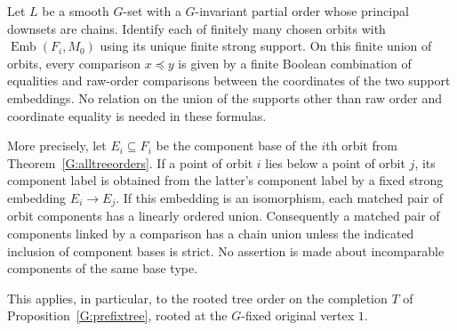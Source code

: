 \begin{proposition}
\label{G:order-only-tree-comparisons}
Let $L$ be a smooth $G$-set with a $G$-invariant partial order
whose principal downsets are chains. Identify each of finitely
many chosen orbits with $\operatorname{Emb}(F_i,M_0)$ using its
unique finite strong support. On this finite union of orbits,
every comparison $x\preceq y$ is given by a finite Boolean
combination of equalities and raw-order comparisons between
the coordinates of the two support embeddings. No relation on
the union of the supports other than raw order and coordinate
equality is needed in these formulas.

More precisely, let $E_i\subseteq F_i$ be the component base
of the $i$th orbit from Theorem~\ref{G:alltreeorders}. If a
point of orbit $i$ lies below a point of orbit $j$, its component
label is obtained from the latter's component label by a fixed
strong embedding $E_i\to E_j$. If this embedding is an
isomorphism, each matched pair of orbit components has a
linearly ordered union. Consequently a matched pair of
components linked by a comparison has a chain union unless
the indicated inclusion of component bases is strict. No
assertion is made about incomparable components of the same
base type.

This applies, in particular, to the rooted tree order on the
completion $T$ of Proposition~\ref{G:prefixtree}, rooted at
the $G$-fixed original vertex $1$.
\end{proposition}
